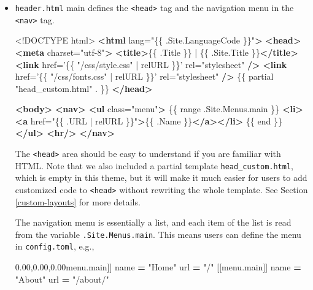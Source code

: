 \documentclass[12pt,]{krantz}
\makeatletter
\newenvironment{Shaded}{\begin{snugshade}}{\end{snugshade}}
\newcommand{\AttributeTok}[1]{\textcolor[rgb]{0.77,0.63,0.00}{#1}}
\newcommand{\DataTypeTok}[1]{\textcolor[rgb]{0.13,0.29,0.53}{#1}}
\newcommand{\KeywordTok}[1]{\textcolor[rgb]{0.13,0.29,0.53}{\textbf{#1}}}
\newcommand{\NormalTok}[1]{#1}
\newcommand{\OperatorTok}[1]{\textcolor[rgb]{0.81,0.36,0.00}{\textbf{#1}}}
\newcommand{\OtherTok}[1]{\textcolor[rgb]{0.56,0.35,0.01}{#1}}
\newcommand{\StringTok}[1]{\textcolor[rgb]{0.31,0.60,0.02}{#1}}
\newcommand{\VariableTok}[1]{\textcolor[rgb]{0.00,0.00,0.00}{#1}}
\newenvironment{kframe}{%
\medskip{}
\setlength{\fboxsep}{.8em}
 \def\at@end@of@kframe{}%
 \ifinner\ifhmode%
  \def\at@end@of@kframe{\end{minipage}}%
  \begin{minipage}{\columnwidth}%
 \fi\fi%
 \def\FrameCommand##1{\hskip\@totalleftmargin \hskip-\fboxsep
 \colorbox{shadecolor}{##1}\hskip-\fboxsep
     \hskip-\linewidth \hskip-\@totalleftmargin \hskip\columnwidth}%
 \MakeFramed {\advance\hsize-\width
   \@totalleftmargin\z@ \linewidth\hsize
   \@setminipage}}%
 {\par\unskip\endMakeFramed%
 \at@end@of@kframe}
\renewenvironment{Shaded}{\begin{kframe}}{\end{kframe}}
\theoremstyle{definition}
\theoremstyle{definition}
\theoremstyle{definition}
\theoremstyle{remark}
\makeatother
\begin{document}
\begin{itemize}
  \begin{itemize}
  \item
    \texttt{header.html} main defines the
    \texttt{\textless{}head\textgreater{}} tag and the navigation menu
    in the \texttt{\textless{}nav\textgreater{}} tag.

\begin{Shaded}
\begin{Highlighting}[]
\DataTypeTok{<!DOCTYPE }\NormalTok{html}\DataTypeTok{>}
\KeywordTok{<html}\OtherTok{ lang=}\StringTok{"\{\{ .Site.LanguageCode \}\}"}\KeywordTok{>}
  \KeywordTok{<head>}
    \KeywordTok{<meta}\OtherTok{ charset=}\StringTok{"utf-8"}\KeywordTok{>}
    \KeywordTok{<title>}\NormalTok{\{\{ .Title \}\} | \{\{ .Site.Title \}\}}\KeywordTok{</title>}
    \KeywordTok{<link}\OtherTok{ href=}\StringTok{'\{\{ "/css/style.css" | relURL \}\}'}
\OtherTok{      rel=}\StringTok{"stylesheet"} \KeywordTok{/>}
    \KeywordTok{<link}\OtherTok{ href=}\StringTok{'\{\{ "/css/fonts.css" | relURL \}\}'}
\OtherTok{      rel=}\StringTok{"stylesheet"} \KeywordTok{/>}
\NormalTok{    \{\{ partial "head_custom.html" . \}\}}
  \KeywordTok{</head>}

  \KeywordTok{<body>}
    \KeywordTok{<nav>}
    \KeywordTok{<ul}\OtherTok{ class=}\StringTok{"menu"}\KeywordTok{>}
\NormalTok{      \{\{ range .Site.Menus.main \}\}}
      \KeywordTok{<li><a}\OtherTok{ href=}\StringTok{"\{\{ .URL | relURL \}\}"}\KeywordTok{>}\NormalTok{\{\{ .Name \}\}}\KeywordTok{</a></li>}
\NormalTok{      \{\{ end \}\}}
    \KeywordTok{</ul>}
    \KeywordTok{<hr/>}
    \KeywordTok{</nav>}
\end{Highlighting}
\end{Shaded}

    The \texttt{\textless{}head\textgreater{}} area should be easy to
    understand if you are familiar with HTML. Note that we also included
    a partial template \texttt{head\_custom.html}, which is empty in
    this theme, but it will make it much easier for users to add
    customized code to \texttt{\textless{}head\textgreater{}} without
    rewriting the whole template. See Section \ref{custom-layouts} for
    more details.

    The navigation menu is essentially a list, and each item of the list
    is read from the variable \texttt{.Site.Menus.main}. This means
    users can define the menu in \texttt{config.toml}, e.g.,

\begin{Shaded}
\begin{Highlighting}[]
\NormalTok{[[}\VariableTok{menu}\NormalTok{.}\AttributeTok{main}\NormalTok{]]}
\NormalTok{    name }\OperatorTok{=} \StringTok{"Home"}
\NormalTok{    url }\OperatorTok{=} \StringTok{"/"}
\NormalTok{[[}\VariableTok{menu}\NormalTok{.}\AttributeTok{main}\NormalTok{]]}
\NormalTok{    name }\OperatorTok{=} \StringTok{"About"}
\NormalTok{    url }\OperatorTok{=} \StringTok{"/about/"}
\end{Highlighting}
\end{Shaded}


\end{itemize}
\end{itemize}
\end{document}
